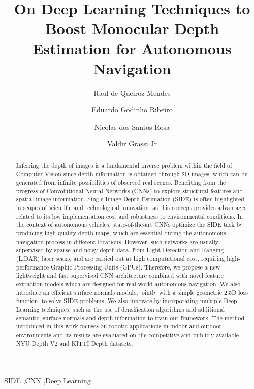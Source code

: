 \documentclass[5p]{elsarticle}
\begin{document}
\begin{frontmatter}

\title{On Deep Learning Techniques to Boost Monocular Depth Estimation for Autonomous Navigation}

\author[address1]{Raul de Queiroz Mendes}
\author[address1]{Eduardo Godinho Ribeiro}
\author[address1]{Nicolas dos Santos Rosa}
\author[address1]{Valdir Grassi Jr}

\address[address1]{Department of Computer and Electrical Engineering, S\~{a}o Carlos School of Engineering, University of S\~{a}o Paulo, Brazil}



\begin{abstract}
Inferring the depth of images is a fundamental inverse problem within the field of Computer Vision since depth information is obtained through 2D images, which can be generated from infinite possibilities of observed real scenes. Benefiting from the progress of Convolutional Neural Networks (CNNs) to explore structural features and spatial image information, Single Image Depth Estimation (SIDE) is often highlighted in scopes of scientific and technological innovation, as this concept provides advantages related to its low implementation cost and robustness to environmental conditions. In the context of autonomous vehicles, state-of-the-art CNNs optimize the SIDE task by producing high-quality depth maps, which are essential during the autonomous navigation process in different locations. However, such networks are usually supervised by sparse and noisy depth data, from Light Detection and Ranging (LiDAR) laser scans, and are carried out at high computational cost, requiring high-performance Graphic Processing Units (GPUs). Therefore, we propose a new lightweight and fast supervised CNN architecture combined with novel feature extraction models which are designed for real-world autonomous navigation. We also introduce an efficient surface normals module, jointly with a simple geometric 2.5D loss function, to solve SIDE problems. We also innovate by incorporating multiple Deep Learning techniques, such as the use of densification algorithms and additional semantic, surface normals and depth information to train our framework. The method introduced in this work focuses on robotic applications in indoor and outdoor environments and its results are evaluated on the competitive and publicly available NYU Depth V2 and KITTI Depth datasets.
\end{abstract}


\begin{keyword}
SIDE \sep CNN \sep Deep Learning
\end{keyword}

\end{frontmatter}
\end{document}

